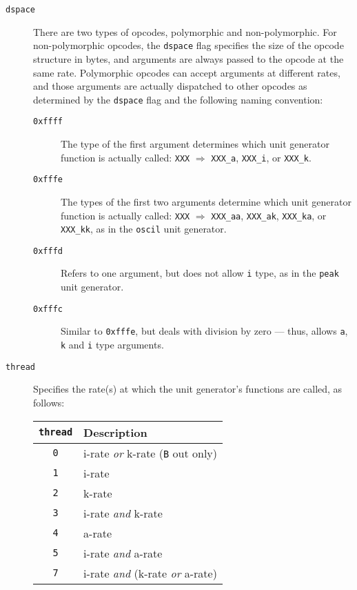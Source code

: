 \documentclass[10pt,letterpaper,onecolumn]{ltxguide}
\begin{document}
\begin{description}  
	\item[\texttt{dspace}] There are two types of opcodes, polymorphic and non-polymorphic. For non-polymorphic opcodes, the \texttt{dspace} flag specifies the size of the opcode structure in bytes, and arguments are always passed to the opcode at the same rate. Polymorphic opcodes can accept arguments at different rates, and those arguments are actually dispatched to other opcodes as determined by the \texttt{dspace} flag and the following naming convention:

	\begin{description}
		\item[\texttt{0xffff}] The type of the first argument determines which unit generator function is actually called: \texttt{XXX} $\Longrightarrow$ \texttt{XXX\_a}, \texttt{XXX\_i}, or \texttt{XXX\_k}.
		\item[\texttt{0xfffe}] The types of the first two arguments determine which unit generator function is actually called:  \texttt{XXX} $\Longrightarrow$ \texttt{XXX\_aa}, \texttt{XXX\_ak}, \texttt{XXX\_ka}, or \texttt{XXX\_kk}, as in the \texttt{oscil} unit generator.
		\item[\texttt{0xfffd}] Refers to one argument, but does not allow \texttt{i} type, as in the \texttt{peak} unit generator.
		\item[\texttt{0xfffc}] Similar to \texttt{0xfffe}, but deals with division by zero --- thus, allows \texttt{a}, \texttt{k} and \texttt{i} type arguments.
	\end{description}

	\item[\texttt{thread}] Specifies the rate(s) at which the unit generator's functions are called, as follows:
	
			\begin{center}
			\begin{tabular*}{280pt}[t]{cl}
			\texttt{thread} & Description \\
			\hline
			\texttt{0} & i-rate \emph{or} k-rate (\texttt{B} out only) \\
			\texttt{1} & i-rate \\
			\texttt{2} & k-rate \\
			\texttt{3} & i-rate \emph{and} k-rate\\
			\texttt{4} & a-rate \\
			\texttt{5} & i-rate \emph{and} a-rate \\
			\texttt{7} & i-rate \emph{and} (k-rate \emph{or} a-rate) \\
			\end{tabular*}
			\end{center}
	

\end{description}
\end{document}
